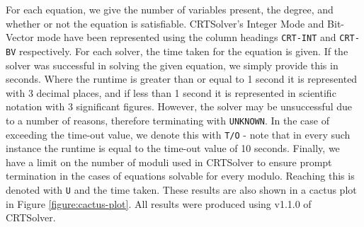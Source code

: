 For each equation, we give the number of variables present, the degree, and whether or not the equation is 
satisfiable. CRTSolver's Integer Mode and Bit-Vector mode have been represented using the column headings 
\texttt{CRT-INT} and \texttt{CRT-BV} respectively. For each solver, the time taken for the equation is given. 
If the solver was successful in solving the given equation, we simply provide this in seconds. Where
the runtime is greater than or equal to 1 second it is represented with 3 decimal places, and if less 
than 1 second it is represented in scientific notation with 3 significant figures. 
However, the solver may be unsuccessful due to
a number of reasons, therefore terminating with \texttt{UNKNOWN}.
%
In the case of exceeding the time-out value,
we denote this with \texttt{T/O} - note that in every such instance the runtime is equal to the 
time-out value of 10 seconds.
%
Finally, we have a limit on the number of moduli used in CRTSolver to
ensure prompt termination in the cases of equations solvable for every
modulo.
Reaching this is denoted with \texttt{U} and the time taken.
These results are also shown in a cactus plot in Figure \ref{figure:cactus-plot}.
All results were produced using v1.1.0 of CRTSolver.

